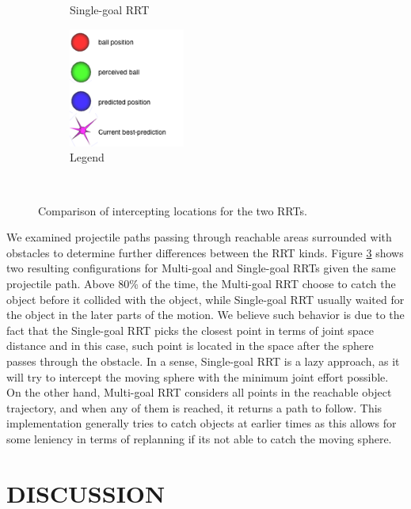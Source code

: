 \documentclass[letterpaper, 10 pt, conference]{ieeeconf}  %
\begin{document}
\begin{figure}
\begin{subfigure}[b]{0.4\textwidth}
                \caption{Single-goal RRT}
                \label{fig:vissingle}
        \end{subfigure}
        \begin{subfigure}[b]{0.4\textwidth}
                \centering
                \includegraphics[width=1.5in]{fig/legends}
                \caption{Legend}
                \label{fig:legends}
        \end{subfigure}
        ~ %
        \caption{Comparison of intercepting locations for the two RRTs.
        }\label{fig:visrrts}
\end{figure}

We examined projectile paths passing through reachable areas surrounded
with obstacles to determine further differences between the RRT
kinds. Figure \ref{fig:visrrts} shows two resulting configurations for
Multi-goal and Single-goal RRTs given the same projectile path. Above
80\% of the time, the Multi-goal RRT choose to catch the object before it
collided with the object, while Single-goal RRT usually waited for the
object in the later parts of the motion. We believe such behavior is due
to the fact that the Single-goal RRT picks the closest point in terms of
joint space distance and in this case, such point is located in the
space after the sphere passes through the obstacle. In a sense,
Single-goal RRT is a lazy approach, as it will try to intercept the
moving sphere with the minimum joint effort possible. On the other hand,
Multi-goal RRT considers all points in the reachable object trajectory,
and when any of them is reached, it returns a path to follow. This
implementation generally tries to catch objects at earlier times as this
allows for some leniency in terms of replanning if its not able to catch
the moving sphere.



\section{DISCUSSION}
\end{document}
